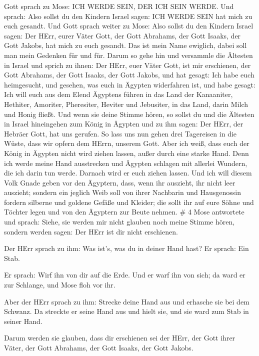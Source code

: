  Gott sprach zu Mose: ICH WERDE SEIN, DER ICH SEIN WERDE.
Und sprach: Also sollst du den Kindern Israel sagen: ICH WERDE SEIN hat
mich zu euch gesandt.  Und Gott sprach weiter zu Mose: Also
sollst du den Kindern Israel sagen: Der HErr, eurer Väter Gott, der Gott
Abrahams, der Gott Isaaks, der Gott Jakobs, hat mich zu euch gesandt.
Das ist mein Name ewiglich, dabei soll man mein Gedenken für und für.
 Darum so gehe hin und versammle die Ältesten in Israel und
sprich zu ihnen: Der HErr, euer Väter Gott, ist mir erschienen, der Gott
Abrahams, der Gott Isaaks, der Gott Jakobs, und hat gesagt: Ich habe
euch heimgesucht, und gesehen, was euch in Ägypten widerfahren ist,
 und habe gesagt: Ich will euch aus dem Elend Ägyptens
führen in das Land der Kanaaniter, Hethiter, Amoriter, Pheresiter,
Heviter und Jebusiter, in das Land, darin Milch und Honig fließt.
 Und wenn sie deine Stimme hören, so sollst du und die
Ältesten in Israel hineingehen zum König in Ägypten und zu ihm sagen:
Der HErr, der Hebräer Gott, hat uns gerufen. So lass uns nun gehen drei
Tagereisen in die Wüste, dass wir opfern dem HErrn, unserem Gott.
 Aber ich weiß, dass euch der König in Ägypten nicht wird
ziehen lassen, außer durch eine starke Hand.  Denn ich
werde meine Hand ausstrecken und Ägypten schlagen mit allerlei Wundern,
die ich darin tun werde. Darnach wird er euch ziehen lassen.
 Und ich will diesem Volk Gnade geben vor den Ägyptern,
dass, wenn ihr auszieht, ihr nicht leer auszieht;  sondern
ein jeglich Weib soll von ihrer Nachbarin und Hausgenossin fordern
silberne und goldene Gefäße und Kleider; die sollt ihr auf eure Söhne
und Töchter legen und von den Ägyptern zur Beute nehmen. \# 4
 Mose antwortete und sprach: Siehe, sie werden mir nicht
glauben noch meine Stimme hören, sondern werden sagen: Der HErr ist dir
nicht erschienen.

 Der HErr sprach zu ihm: Was ist's, was du in deiner Hand
hast? Er sprach: Ein Stab.

 Er sprach: Wirf ihn von dir auf die Erde. Und er warf ihn
von sich; da ward er zur Schlange, und Mose floh vor ihr.

 Aber der HErr sprach zu ihm: Strecke deine Hand aus und
erhasche sie bei dem Schwanz. Da streckte er seine Hand aus und hielt
sie, und sie ward zum Stab in seiner Hand.

 Darum werden sie glauben, dass dir erschienen sei der HErr,
der Gott ihrer Väter, der Gott Abrahams, der Gott Isaaks, der Gott
Jakobs.


